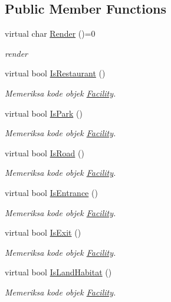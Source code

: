 \subsection*{Public Member Functions}
\begin{DoxyCompactItemize}
\item 
virtual char \hyperlink{classFacility_a177b3f9cd142fe4521c1d15b00d3675c}{Render} ()=0
\begin{DoxyCompactList}\small\item\em render \end{DoxyCompactList}\item 
virtual bool \hyperlink{classFacility_a2fb6a0e98e709b46b21e35cb8aeeeda7}{Is\+Restaurant} ()
\begin{DoxyCompactList}\small\item\em Memeriksa kode objek \hyperlink{classFacility}{Facility}. \end{DoxyCompactList}\item 
virtual bool \hyperlink{classFacility_acd5c991c33b331d67bb559f962d3bbc0}{Is\+Park} ()
\begin{DoxyCompactList}\small\item\em Memeriksa kode objek \hyperlink{classFacility}{Facility}. \end{DoxyCompactList}\item 
virtual bool \hyperlink{classFacility_ae2975cf479c3907e13fc200464b7443b}{Is\+Road} ()
\begin{DoxyCompactList}\small\item\em Memeriksa kode objek \hyperlink{classFacility}{Facility}. \end{DoxyCompactList}\item 
virtual bool \hyperlink{classFacility_a256cb0f3621b6545ec212d56672d5b3e}{Is\+Entrance} ()
\begin{DoxyCompactList}\small\item\em Memeriksa kode objek \hyperlink{classFacility}{Facility}. \end{DoxyCompactList}\item 
virtual bool \hyperlink{classFacility_aa6ed2cd4c8b1dc21a478c26707d16ef5}{Is\+Exit} ()
\begin{DoxyCompactList}\small\item\em Memeriksa kode objek \hyperlink{classFacility}{Facility}. \end{DoxyCompactList}\item 
virtual bool \hyperlink{classFacility_a1a8bbfab30dce85b0c581715cb4af1dd}{Is\+Land\+Habitat} ()
\begin{DoxyCompactList}\small\item\em Memeriksa kode objek \hyperlink{classFacility}{Facility}. \end{DoxyCompactList}\item 

\end{DoxyCompactItemize}
